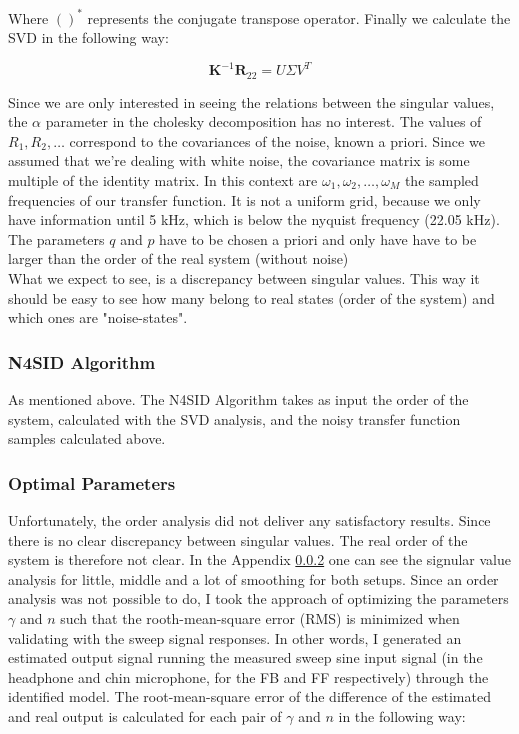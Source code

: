 Where $()^*$ represents the conjugate transpose operator. Finally we calculate the SVD in the following way:

\[\textbf{K}^{-1}\textbf{R}_{22} = U\Sigma V^T\]

Since we are only interested in seeing the relations between the singular values, the $\alpha$ parameter in the cholesky decomposition has no interest. The values of $R_1, R_2, \dots$ correspond to the covariances of the noise, known a priori. Since we assumed that we're dealing with white noise, the covariance matrix is some multiple of the identity matrix. In this context are $\omega_1, \omega_2,\dots,\omega_M$ the sampled frequencies of our transfer function. It is not a uniform grid, because we only have information until 5 kHz, which is below the nyquist frequency (22.05 kHz). The parameters $q$ and $p$ have to be chosen a priori and only have have to be larger than the order of the real system (without noise)\\

What we expect to see, is a discrepancy between singular values. This way it should be easy to see how many belong to real states (order of the system) and which ones are "noise-states".

\subsubsection{N4SID Algorithm}

As mentioned above. The N4SID Algorithm takes as input the order of the system, calculated with the SVD analysis, and the noisy transfer function samples calculated above. 

\subsubsection{Optimal Parameters}

Unfortunately, the order analysis did not deliver any satisfactory results. Since there is no clear discrepancy between singular values. The real order of the system is therefore not clear. In the Appendix \ref{} one can see the signular value analysis for little, middle and a lot of smoothing for both setups. Since an order analysis was not possible to do, I took the approach of optimizing the parameters $\gamma$ and $n$ such that the rooth-mean-square error (RMS) is minimized when validating with the sweep signal responses. In other words, I generated an estimated output signal running the measured sweep sine input signal (in the headphone and chin microphone, for the FB and FF respectively) through the identified model. The root-mean-square error of the difference of the estimated and real output is calculated for each pair of $\gamma$ and $n$ in the following way:


